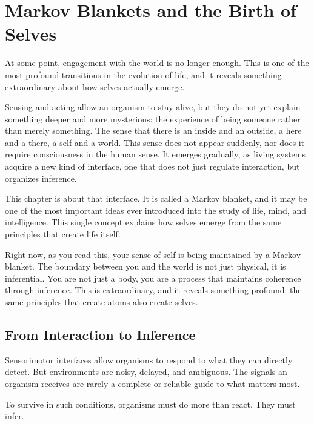 \documentclass[
  openright]{book}
\begin{document}
\chapter{\texorpdfstring{Markov Blankets and the
Birth of
Selves}{Markov Blankets and the Birth of Selves}}\label{markov-blankets-and-the-birth-of-selves}

At some point, engagement with the world is no longer enough. This is
one of the most profound transitions in the evolution of life, and it
reveals something extraordinary about how selves actually emerge.

Sensing and acting allow an organism to stay alive, but they do not yet
explain something deeper and more mysterious: the experience of being
someone rather than merely something. The sense that there is an inside
and an outside, a here and a there, a self and a world. This sense does
not appear suddenly, nor does it require consciousness in the human
sense. It emerges gradually, as living systems acquire a new kind of
interface, one that does not just regulate interaction, but organizes
inference.

This chapter is about that interface. It is called a
Markov blanket, and it may be one of the most
important ideas ever introduced into the study of life, mind, and
intelligence. This single concept explains how selves emerge from the
same principles that create life itself.

Right now, as you read this, your sense of self is being maintained by a
Markov blanket. The boundary between you and the world is not just
physical, it is inferential. You are not just a body, you are a process
that maintains coherence through inference. This is extraordinary, and
it reveals something profound: the same principles that create atoms
also create selves.

\section{From Interaction to
Inference}\label{from-interaction-to-inference}

Sensorimotor interfaces allow organisms to respond to what they can
directly detect. But environments are noisy, delayed, and ambiguous. The
signals an organism receives are rarely a complete or reliable guide to
what matters most.

To survive in such conditions, organisms must do more than react. They
must infer.
\end{document}
